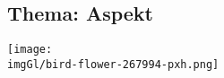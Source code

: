 
\subsection{Thema: Aspekt}


\begin{center}
  \texttt{[image: \\imgGl/bird-flower-267994-pxh.png]}
\end{center}


